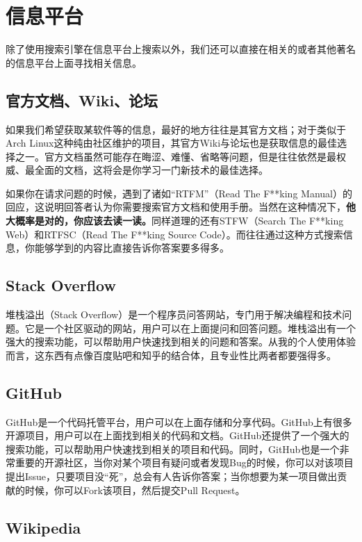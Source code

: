 \documentclass[../main.tex]{subfiles}
\begin{document}
\section{信息平台}

除了使用搜索引擎在信息平台上搜索以外，我们还可以直接在相关的或者其他著名的信息平台上面寻找相关信息。

\subsection{官方文档、Wiki、论坛}

如果我们希望获取某软件等的信息，最好的地方往往是其官方文档；对于类似于Arch Linux这种纯由社区维护的项目，其官方Wiki与论坛也是获取信息的最佳选择之一。官方文档虽然可能存在晦涩、难懂、省略等问题，但是往往依然是最权威、最全面的文档，这将会是你学习一门新技术的最佳选择。

如果你在请求问题的时候，遇到了诸如“RTFM”（Read The F**king Manual）的回应，这说明回答者认为你需要搜索官方文档和使用手册。当然在这种情况下，\textbf{他大概率是对的，你应该去读一读。}同样道理的还有STFW（Search The F**king Web）和RTFSC（Read The F**king Source Code）。而往往通过这种方式搜索信息，你能够学到的内容比直接告诉你答案要多得多。

\subsection{Stack Overflow}

堆栈溢出（Stack Overflow）是一个程序员问答网站，专门用于解决编程和技术问题。它是一个社区驱动的网站，用户可以在上面提问和回答问题。堆栈溢出有一个强大的搜索功能，可以帮助用户快速找到相关的问题和答案。从我的个人使用体验而言，这东西有点像百度贴吧和知乎的结合体，且专业性比两者都要强得多。

\subsection{GitHub}

GitHub是一个代码托管平台，用户可以在上面存储和分享代码。GitHub上有很多开源项目，用户可以在上面找到相关的代码和文档。GitHub还提供了一个强大的搜索功能，可以帮助用户快速找到相关的项目和代码。同时，GitHub也是一个非常重要的开源社区，当你对某个项目有疑问或者发现Bug的时候，你可以对该项目提出Issue，只要项目没“死”，总会有人告诉你答案；当你想要为某一项目做出贡献的时候，你可以Fork该项目，然后提交Pull Request。

\subsection{Wikipedia}
\end{document}
